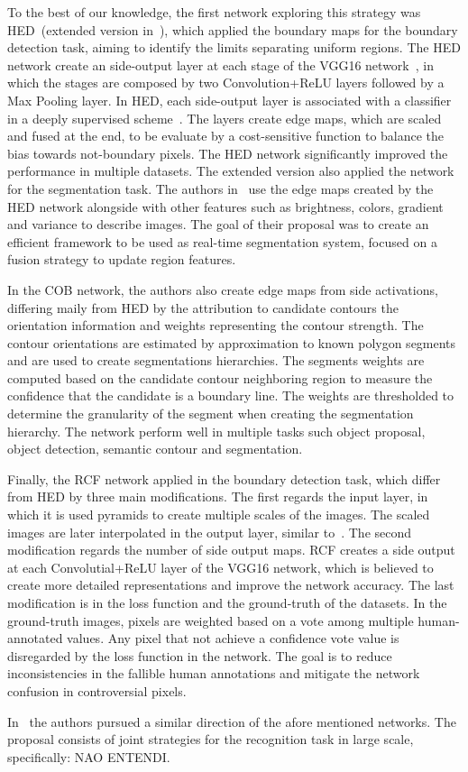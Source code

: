 To the best of our knowledge, the first network exploring this strategy was HED~(extended version in~\cite{Xie:2017:HED:3158436.3158453}), which applied the boundary maps for the boundary detection task, aiming to identify the limits separating uniform regions. The HED network create an side-output layer at each stage of the VGG16 network~\cite{simonyan2014}, in which the stages are composed by two Convolution+ReLU layers followed by a Max Pooling layer. In HED, each side-output layer is associated with a classifier in a deeply supervised scheme~\cite{lee2015}. The layers create edge maps, which are scaled and fused at the end, to be evaluate by a cost-sensitive function to balance the bias towards not-boundary pixels. The HED network significantly improved the performance in multiple datasets. The extended version also applied the network for the segmentation task. The authors in~\cite{cheng2016} use the edge maps created by the HED network alongside with other features such as brightness, colors, gradient and variance to describe images. The goal of their proposal was to create an efficient framework to be used as real-time segmentation system, focused on a fusion strategy to update region features.


In the COB network, the authors also create edge maps from side activations, differing maily from HED by the attribution to candidate contours the orientation information and weights representing the contour strength. The contour orientations are estimated by approximation to known polygon segments and are used to create segmentations hierarchies. The segments weights are computed based on the candidate contour neighboring region to measure the confidence that the candidate is a boundary line. The weights are thresholded to determine the granularity of the segment when creating the segmentation hierarchy. The network perform well in multiple tasks such object proposal, object detection, semantic contour and segmentation.


Finally, the RCF network applied in the boundary detection task, which differ from HED by three main modifications. The first regards the input layer, in which it is used pyramids to create multiple scales of the images. The scaled images are later interpolated in the output layer, similar to~\cite{farabet2012}. The second modification regards the number of side output maps. RCF creates a side output at each Convolutial+ReLU layer of the VGG16 network, which is believed to create more detailed representations and improve the network accuracy. The last modification is in the loss function and the ground-truth of the datasets. In the ground-truth images, pixels are weighted based on a vote among multiple human-annotated values. Any pixel that not achieve a confidence vote value is disregarded by the loss function in the network. The goal is to reduce inconsistencies in the fallible human annotations and mitigate the network confusion in controversial pixels.  

In~\cite{fan2017} the authors pursued a similar direction of the afore mentioned networks. The proposal consists of joint strategies for the recognition task in large scale, specifically:  {\color{green} NAO ENTENDI}.
 
